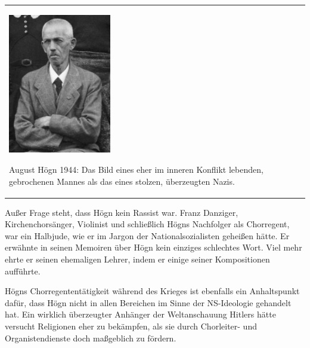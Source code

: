 \begin{center}
\begin{minipage}{4.928cm}
\begin{flushleft}
\tablefirsthead{}
\tablehead{}
\tabletail{}
\tablelasttail{}
\begin{supertabular}{m{4.728cm}}

\includegraphics[width=4.503cm,height=6.103cm]{pictures/zulassungsarbeit-img036.jpg}

August Högn 1944: Das Bild eines eher
im inneren Konflikt lebenden, gebrochenen Mannes als das eines stolzen,
überzeugten Nazis.\\
\end{supertabular}
\end{flushleft}
\end{minipage}
\end{center}
Außer Frage steht, dass Högn kein Rassist war. Franz Danziger,
Kirchenchorsänger, Violinist und schließlich Högns Nachfolger als
Chorregent, war ein Halbjude, wie er im Jargon der Nationalsozialisten
geheißen hätte. Er erwähnte in seinen Memoiren über Högn kein einziges
schlechtes Wort. Viel mehr ehrte er seinen ehemaligen Lehrer, indem er
einige seiner Kompositionen aufführte.

Högns Chorregententätigkeit während des Krieges ist ebenfalls ein
Anhaltspunkt dafür, dass Högn nicht in allen Bereichen im Sinne der
NS-Ideologie gehandelt hat. Ein wirklich überzeugter Anhänger der
Weltanschauung Hitlers hätte versucht Religionen eher zu bekämpfen, als
sie durch Chorleiter- und Organistendienste doch maßgeblich zu fördern.
